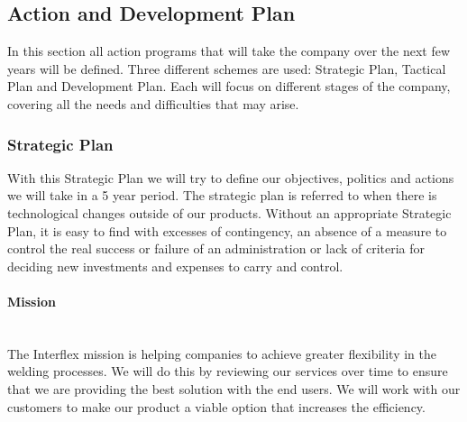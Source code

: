 \subsection{Action and Development Plan}
In this section all action programs that will take the company over the next few years will be defined. Three different schemes are used: Strategic Plan, Tactical Plan and Development Plan. Each will focus on different stages of the company, covering all the needs and difficulties that may arise.

\subsubsection{Strategic Plan}
With this Strategic Plan we will try to define our objectives, politics and actions we will take in a 5 year period. 
The strategic plan is referred to when there is technological changes outside of our products. 
Without an appropriate Strategic Plan, it is easy to find with excesses of contingency, an absence of a measure to control the real success or failure of an administration or lack of criteria for deciding new investments and expenses to carry and control.

\paragraph*{Mission}~\\
The Interflex mission is helping companies to achieve greater flexibility in the welding processes.
We will do this by reviewing our services over time to ensure that we are providing the best solution with the end users.
We will work with our customers to make our product a viable option that increases the efficiency. 



